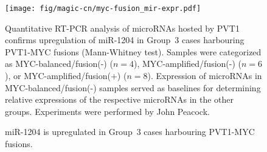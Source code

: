 \documentclass[11pt,letterpaper]{article}
\theoremstyle{definition}
\begin{document}
\begin{figure}[h]
	\begin{center}
		\texttt{[image: fig/magic-cn/myc-fusion\_mir-expr.pdf]}
	\end{center}
	\caption{miR-1204 is upregulated in Group~3 cases harbouring PVT1-MYC fusions.}
	Quantitative RT-PCR analysis of microRNAs hosted by PVT1 confirms upregulation of miR-1204 in Group~3 cases harbouring PVT1-MYC fusions (Mann-Whitney test). Samples were categorized as MYC-balanced/fusion(-) ($n = 4$), MYC-amplified/fusion(-) ($n = 6$), or MYC-amplified/fusion(+) ($n = 8$). Expression of microRNAs in MYC-balanced/fusion(-) samples served as baselines for determining relative expressions of the respective microRNAs in the other groups. Experiments were performed by John Peacock.
	\label{fig:myc-fusion_mir-expr}
\end{figure}




\clearpage

\section{}

\begin{multicols}{2}
\small
{}
\end{multicols}

\clearpage

\end{document}
